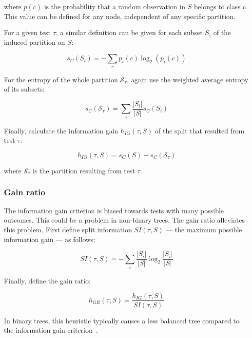where $p(c)$ is the probability that a random observation in $S$ belongs to class c. This value can be defined for any node, independent of any specific partition.

For a given test $\tau$, a similar definition can be given for each subset $S_i$ of the induced partition on $S$:

\begin{equation}
    s_C(S_i) = - \sum_c p_i(c) \log_2(p_i(c))
\end{equation}

For the entropy of the whole partition $\mathcal{S}_\tau$, again use the weighted average entropy of its subsets:

\begin{equation}
    s_C(\mathcal{S}_\tau) = \sum_i \frac{|S_i|}{|S|} s_C(S_i)
\end{equation}

Finally, calculate the information gain $h_{IG}(\tau, S)$ of the split that resulted from test $\tau$:

\begin{equation}
    h_{IG}(\tau, S) = s_C(S) - s_C(\mathcal{S}_\tau)
\end{equation}

where $\mathcal{S}_\tau$ is the partition resulting from test $\tau$.

\subsubsection{Gain ratio}
The information gain criterion is biased towards tests with many possible outcomes. This could be a problem in non-binary trees. The gain ratio alleviates this problem. First define split information $SI(\tau, S)$ --- the maximum possible information gain --- as follows:

\begin{equation}
    SI(\tau, S) = - \sum_i \frac{|S_i|}{|S|} \log_2 \frac{|S_i|}{|S|}
\end{equation}

Finally, define the gain ratio:

\begin{equation}
    h_{GR}(\tau, S) = \frac{h_{IG}(\tau, S)}{SI(\tau, S)}
\end{equation}

In binary trees, this heuristic typically causes a less balanced tree compared to the information gain criterion~\cite{c45}.

